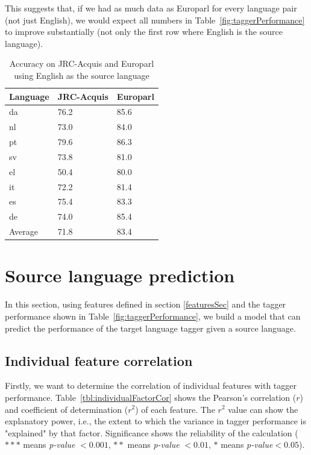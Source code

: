  
This suggests that, if we had as much data as Europarl for every language pair (not just English), we would expect all numbers in Table~\ref{fig:taggerPerformance} to improve substantially (not only the first row where English is the source language). 
\begin{table}
\small
\centering
    \begin{tabular}{lll}
    Language & JRC-Acquis & Europarl \\
    \hline
    da       &    76.2    &    85.6         \\ 
    nl       &    73.0    &    84.0         \\
    pt       &    79.6    &    86.3         \\
    sv       &    73.8    &    81.0         \\
    el       &    50.4    &    80.0         \\
    it       &    72.2    &    81.4         \\
    es       &    75.4    &    83.3         \\
    de       &    74.0    &    85.4         \\
    \hline
    Average  & 71.8       & 83.4            \\
    \end{tabular}
    \caption{Accuracy on JRC-Acquis and Europarl using English as the source language}
    \label{tbl:acc2Models}
\end{table}


\section{Source language prediction} 
\label{sec:sourceLanguagePrediction}
In this section, using features defined in section \ref{featuresSec} and the tagger performance shown in Table~\ref{fig:taggerPerformance}, we build a model that can predict the performance of the target language tagger given a source language. 

\subsection{Individual feature correlation}
Firstly, we want to determine the correlation of individual features with tagger performance. Table~\ref{tbl:individualFactorCor} shows the Pearson's correlation ($r$) and coefficient of determination ($r^2$) of each feature. The $r^2$ value can show the explanatory power, i.e., the extent to which the variance in tagger performance is "explained" by that factor. Significance shows the reliability of the calculation ($***$ means  
\emph{p-value} $< 0.001$, $**$ means \emph{p-value} $< 0.01$, $*$ means \emph{p-value}$ < 0.05$). 

